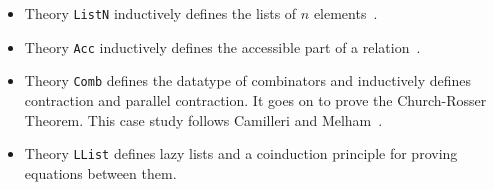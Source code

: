 \begin{itemize}
\item Theory \texttt{ListN} inductively defines the lists of $n$
  elements~\cite{paulin92}.

\item Theory \texttt{Acc} inductively defines the accessible part of a
  relation~\cite{paulin92}.

\item Theory \texttt{Comb} defines the datatype of combinators and
  inductively defines contraction and parallel contraction.  It goes on to
  prove the Church-Rosser Theorem.  This case study follows Camilleri and
  Melham~\cite{camilleri92}.

\item Theory \texttt{LList} defines lazy lists and a coinduction
  principle for proving equations between them.
\end{itemize}


